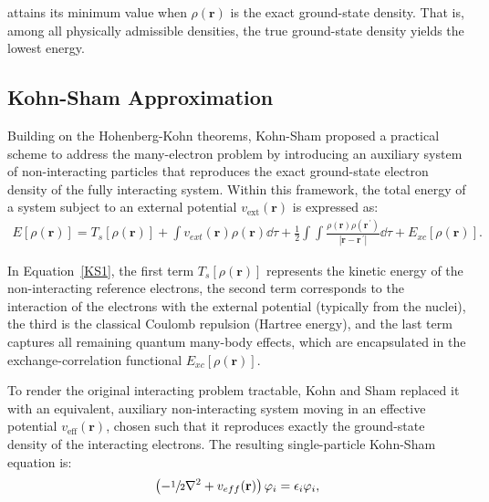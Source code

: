 \noindent attains its minimum value when $\rho(\mathbf{r})$ is the exact ground-state
density. That is, among all physically admissible densities, the true
ground-state density yields the lowest energy.


\subsection{Kohn-Sham Approximation~\cite{Kohn1965}}\label{KSapprox}

Building on the Hohenberg-Kohn theorems, Kohn-Sham proposed a practical
scheme to address the many-electron problem by introducing an auxiliary system
of non-interacting particles that reproduces the exact ground-state electron
density of the fully interacting system. Within this framework, the total
energy of a system subject to an external potential $v_{\text{ext}}(\mathbf{r})$
is expressed as:
%
\begin{align}
  E[\rho(\mathbf{r})] = T_s[\rho(\mathbf{r})]
    + \int v_{ext}(\mathbf{r})\rho(\mathbf{r})\dd\tau
    + \frac12\int\int \frac{\rho(\mathbf{r})\rho(\mathbf{r}^{\,\prime})}{|\mathbf{r}-\mathbf{r}^{\,\prime}|}\dd\tau
    + E_{xc}[\rho(\mathbf{r})].
  \label{KS1}
\end{align}

In Equation~\ref{KS1}, the first term $T_s[\rho(\mathbf{r})]$ represents the
kinetic energy of the non-interacting reference electrons, the second term
corresponds to the interaction of the electrons with the external potential
(typically from the nuclei), the third is the classical Coulomb repulsion
(Hartree energy), and the last term captures all remaining quantum many-body
effects, which are encapsulated in the exchange-correlation functional
$E_{xc}[\rho(\mathbf{r})]$.

\newpage
To render the original interacting problem tractable, Kohn and Sham replaced
it with an equivalent, auxiliary non-interacting system moving in an effective
potential $v_\text{eff}(\mathbf{r})$, chosen such that it reproduces exactly
the ground-state density of the interacting electrons. The resulting
single-particle Kohn-Sham equation is:
%
\begin{align}
  \left (-\sfrac{1}{2}\nabla^2 + v_{eff}(\mathbf{r}) \right )
  \varphi_i = \epsilon_i \varphi_i,
\end{align}


